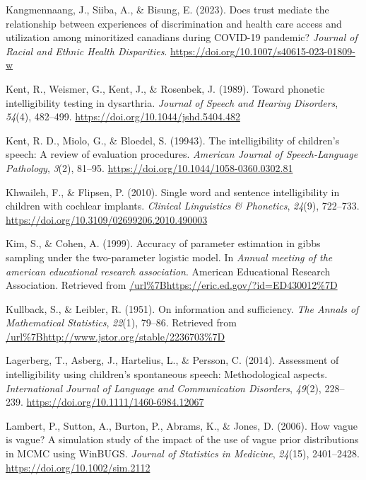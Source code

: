 \documentclass[
]{agujournal2019}
\newlength{\cslhangindent}
\newenvironment{CSLReferences}[2] %
 {\begin{list}{}{%
  \setlength{\itemindent}{0pt}
  \setlength{\leftmargin}{0pt}
  \setlength{\parsep}{0pt}
  \ifodd #1
   \setlength{\leftmargin}{\cslhangindent}
   \setlength{\itemindent}{-1\cslhangindent}
  \fi
  \setlength{\itemsep}{#2\baselineskip}}}
 {\end{list}}
\begin{document}
\begin{CSLReferences}{1}{0}
Kangmennaang, J., Siiba, A., \& Bisung, E. (2023). Does trust mediate
the relationship between experiences of discrimination and health care
access and utilization among minoritized canadians during COVID-19
pandemic? \emph{Journal of Racial and Ethnic Health Disparities}.
\url{https://doi.org/10.1007/s40615-023-01809-w}

Kent, R., Weismer, G., Kent, J., \& Rosenbek, J. (1989). Toward phonetic
intelligibility testing in dysarthria. \emph{Journal of Speech and
Hearing Disorders}, \emph{54}(4), 482--499.
\url{https://doi.org/10.1044/jshd.5404.482}

Kent, R. D., Miolo, G., \& Bloedel, S. (19943). The intelligibility of
children's speech: A review of evaluation procedures. \emph{American
Journal of Speech-Language Pathology}, \emph{3}(2), 81--95.
\url{https://doi.org/10.1044/1058-0360.0302.81}

Khwaileh, F., \& Flipsen, P. (2010). Single word and sentence
intelligibility in children with cochlear implants. \emph{Clinical
Linguistics \& Phonetics}, \emph{24}(9), 722--733.
\url{https://doi.org/10.3109/02699206.2010.490003}

Kim, S., \& Cohen, A. (1999). Accuracy of parameter estimation in gibbs
sampling under the two-parameter logistic model. In \emph{Annual meeting
of the american educational research association}. American Educational
Research Association. Retrieved from
\url{/url\%7Bhttps://eric.ed.gov/?id=ED430012\%7D}

Kullback, S., \& Leibler, R. (1951). On information and sufficiency.
\emph{The Annals of Mathematical Statistics}, \emph{22}(1), 79--86.
Retrieved from \url{/url\%7Bhttp://www.jstor.org/stable/2236703\%7D}

Lagerberg, T., Asberg, J., Hartelius, L., \& Persson, C. (2014).
Assessment of intelligibility using children's spontaneous speech:
Methodological aspects. \emph{International Journal of Language and
Communication Disorders}, \emph{49}(2), 228--239.
\url{https://doi.org/10.1111/1460-6984.12067}

Lambert, P., Sutton, A., Burton, P., Abrams, K., \& Jones, D. (2006).
How vague is vague? A simulation study of the impact of the use of vague
prior distributions in MCMC using WinBUGS. \emph{Journal of Statistics
in Medicine}, \emph{24}(15), 2401--2428.
\url{https://doi.org/10.1002/sim.2112}


\end{CSLReferences}
\end{document}
